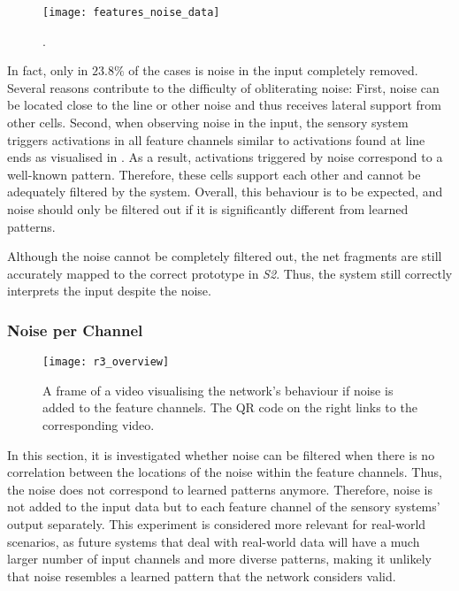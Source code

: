 \begin{figure}[h]
    \centering
    \texttt{[image: features\_noise\_data]}
    \caption[Features triggered by noise]{.}
\end{figure}
%
In fact, only in $23.8\%$ of the cases is noise in the input completely removed.
Several reasons contribute to the difficulty of obliterating noise: First, noise can be located close to the line or other noise and thus receives lateral support from other cells. Second, when observing noise in the input, the sensory system triggers activations in all feature channels similar to activations found at line ends as visualised in .
As a result, activations triggered by noise correspond to a well-known pattern. Therefore, these cells support each other and cannot be adequately filtered by the system.
Overall, this behaviour is to be expected, and noise should only be filtered out if it is significantly different from learned patterns.

Although the noise cannot be completely filtered out, the net fragments are still accurately mapped to the correct prototype in \emph{S2}. Thus, the system still correctly interprets the input despite the noise.

\subsubsection{Noise per Channel}
%
\begin{figure}[h]
    \centering
    \texttt{[image: r3\_overview]}
    \caption[Video visualising the network's behaviour with noise in the feature channels]{A frame of a video visualising the network's behaviour if noise is added to the feature channels. The QR code on the right links to the corresponding video.}
\end{figure}
%
In this section, it is investigated whether noise can be filtered when there is no correlation between the locations of the noise within the feature channels.
Thus, the noise does not correspond to learned patterns anymore.
Therefore, noise is not added to the input data but to each feature channel of the sensory systems' output separately.
This experiment is considered more relevant for real-world scenarios, as future systems that deal with real-world data will have a much larger number of input channels and more diverse patterns, making it unlikely that noise resembles a learned pattern that the network considers valid.

